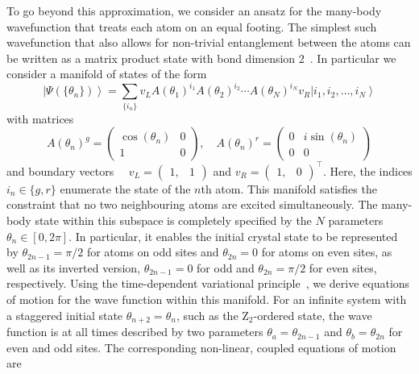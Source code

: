 \documentclass[prl,nobalancelastpage,twocolumn,superscriptaddress,nofootinbib]{revtex4}
\newcommand{\ket}[1]{\left|#1\right\rangle}
\begin{document}
\begin{footnotesize}
To go beyond this approximation, we consider an ansatz for the many-body
wavefunction that treats each atom on an equal footing. The simplest such
wavefunction that also allows for non-trivial entanglement between the atoms
can be written as a matrix product state with bond dimension
2~\cite{Schollwock2011}.  In particular we consider a manifold of states of the
form 
\begin{equation*}
    \ket{\Psi(\{\theta_n\})}=\sum_{\{i_n\}}v_L
A(\theta_1)^{i_1}A(\theta_2)^{i_2}\cdots A(\theta_N)^{i_N}
v_R\ket{i_1,i_2,\dots,i_N}
\end{equation*}
with matrices 
\begin{equation*}
A(\theta_n)^{g}=\left(\begin{array}{cc}\cos(\theta_n) & 0 \\ 1 &
    0\end{array}\right),\quad  A(\theta_n)^{r}=\left(\begin{array}{cc}0 &
    i\sin(\theta_n) \\ 0 & 0\end{array}\right)
\end{equation*}
and boundary vectors $\quad v_{L}=\left(\begin{array}{cc}1, &
1\end{array}\right)$ and  $v_{R}=\left(\begin{array}{cc}1, &
0\end{array}\right)^\intercal$.  Here, the indices $i_n\in \{g,r\}$
enumerate the state of the $n$th atom. This manifold satisfies the
constraint that no two neighbouring atoms are excited simultaneously. The
many-body state within this subspace is completely specified by the $N$
parameters $\theta_n\in [0,2\pi]$.  In particular, it enables the initial
crystal state to be represented
by $\theta_{2n-1}=\pi/2$ for atoms on odd sites and
$\theta_{2n}=0$ for atoms on even sites, as well as its inverted version,
$\theta_{2n-1}=0$ for odd and $\theta_{2n}=\pi/2$ for even sites,
respectively.  Using the time-dependent variational
principle~\cite{Haegeman2011}, we derive equations of motion for the wave
function within this manifold. For an infinite system with a staggered
initial state $\theta_{n+2}=\theta_{n}$, such as the Z$_2$-ordered state,
the wave function is at all times described by two parameters
$\theta_a=\theta_{2n-1}$ and $\theta_{b}=\theta_{2n}$ for even and odd
sites. The corresponding non-linear, coupled equations of motion are
\begin{equation}
    \label{MPS_EOM}
    \begin{aligned}

\end{aligned}
\end{equation}
\end{footnotesize}
\end{document}
